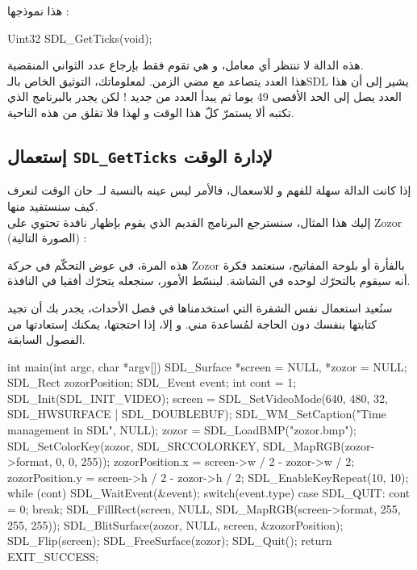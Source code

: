 هذا نموذجها :

\begin{Csource}
Uint32 SDL_GetTicks(void);
\end{Csource}

هذه الدالة لا تنتظر أي معامل، و هي تقوم فقط بإرجاع عدد الثواني المنقضية. \\
هذا العدد يتصاعد مع مضي الزمن. لمعلوماتك، التوثيق الخاص بالـ\textenglish{SDL}
يشير إلى أن هذا العدد يصل إلى الحد الأقصى 49 يوما ثم يبدأ العدد من جديد ! لكن يجدر بالبرنامج الذي تكتبه ألا يستمرّ كلّ هذا الوقت و لهذا فلا تقلق من هذه الناحية.

\subsection{إستعمال \texttt{SDL\_GetTicks} لإدارة الوقت}

إذا كانت الدالة
سهلة للفهم و للاسعمال، فالأمر ليس عينه بالنسبة لـ.
حان الوقت لنعرف كيف سنستفيد منها.\\
إليك هذا المثال، سنسترجع البرنامج القديم الذي يقوم بإظهار نافدة تحتوي على
\textenglish{Zozor}
(الصورة التالية) :


هذه المرة، في عوض التحكّم في حركة
\textenglish{Zozor}
بالفأرة أو بلوحة المفاتيح، سنعتمد فكرة أنه سيقوم بالتحرّك لوحده في الشاشة. لبنسّط الأمور، سنجعله يتحرّك أفقيا في النافذة. 

سنُعيد استعمال نفس الشفرة التي استخدمناها في فصل الأحداث، يجدر بك أن تجيد كتابتها بنفسك دون الحاجة لمُساعدة مني. و إلا،  إذا احتجتها، يمكنك إستعادتها من الفصول السابقة.

\begin{Csource}
int main(int argc, char *argv[])
{
	SDL_Surface *screen = NULL, *zozor = NULL;
	SDL_Rect zozorPosition;
	SDL_Event event;
	int cont = 1;
	SDL_Init(SDL_INIT_VIDEO);
	screen = SDL_SetVideoMode(640, 480, 32, SDL_HWSURFACE | SDL_DOUBLEBUF);
	SDL_WM_SetCaption("Time management in SDL", NULL);
	zozor = SDL_LoadBMP("zozor.bmp");
	SDL_SetColorKey(zozor, SDL_SRCCOLORKEY, SDL_MapRGB(zozor->format, 0, 0, 255));
	zozorPosition.x = screen->w / 2 - zozor->w / 2;
	zozorPosition.y = screen->h / 2 - zozor->h / 2;
	SDL_EnableKeyRepeat(10, 10);
	while (cont)
	{
		SDL_WaitEvent(&event);
		switch(event.type)
		{
			case SDL_QUIT:
			cont = 0;
			break;
		}
		SDL_FillRect(screen, NULL, SDL_MapRGB(screen->format, 255, 255, 255));
		SDL_BlitSurface(zozor, NULL, screen, &zozorPosition);
		SDL_Flip(screen);
	}
	SDL_FreeSurface(zozor);
	SDL_Quit();
	return EXIT_SUCCESS;
}
\end{Csource}


